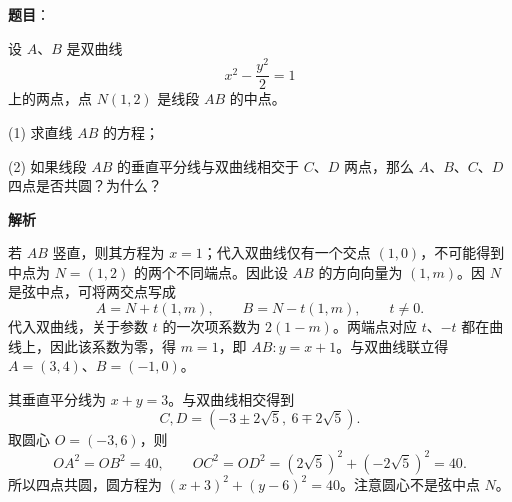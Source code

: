 \begin{answer}

\textbf{题目}：

设 $A\text{、}B$ 是双曲线
\nopagebreak[4]
\[
x^2-\frac{y^2}{2}=1
\]
上的两点，点 $N(1,2)$ 是线段 $AB$ 的中点。

(1) 求直线 $AB$ 的方程；

(2) 如果线段 $AB$ 的垂直平分线与双曲线相交于 $C\text{、}D$ 两点，那么 $A\text{、}B\text{、}C\text{、}D$ 四点是否共圆？为什么？

\textbf{解析}


若 $AB$ 竖直，则其方程为 $x=1$；代入双曲线仅有一个交点 $(1,0)$，不可能得到中点为 $N=(1,2)$ 的两个不同端点。因此设 $AB$ 的方向向量为 $(1,m)$。因 $N$ 是弦中点，可将两交点写成
\nopagebreak[4]
\[
A=N+t(1,m),\qquad B=N-t(1,m),\qquad t\ne0.
\]
代入双曲线，关于参数 $t$ 的一次项系数为 $2(1-m)$。两端点对应 $t$、$-t$ 都在曲线上，因此该系数为零，得 $m=1$，即 $AB:y=x+1$。与双曲线联立得 $A=(3,4)$、$B=(-1,0)$。


其垂直平分线为 $x+y=3$。与双曲线相交得到
\nopagebreak[4]
\[
C,D=(-3\pm2\sqrt5,\ 6\mp2\sqrt5).
\]
取圆心 $O=(-3,6)$，则
\nopagebreak[4]
\[
OA^2=OB^2=40,
\qquad OC^2=OD^2=(2\sqrt5)^2+(-2\sqrt5)^2=40.
\]
所以四点共圆，圆方程为 $(x+3)^2+(y-6)^2=40$。注意圆心不是弦中点 $N$。



\end{answer}
